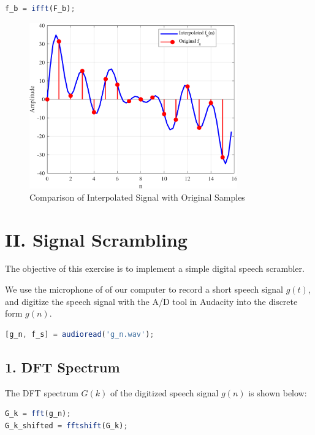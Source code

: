 \documentclass[12pt]{article}
\begin{document}
\begin{lstlisting}[language=Octave, caption=IFFT]
f_b = ifft(F_b);
\end{lstlisting}

\begin{figure}[H]
    \centering
    \includegraphics[width=0.8\textwidth]{f_b.png}
    \caption{Comparison of Interpolated Signal with Original Samples}
\end{figure}


\newpage
\section*{II. Signal Scrambling}
The objective of this exercise is to implement a simple digital speech scrambler.

We use the microphone of of our computer to record a short speech signal $g(t)$, and digitize the speech signal with the A/D tool in Audacity into the discrete form $g(n)$.

\begin{lstlisting}[language=Octave, caption=Reading in Audio File]
[g_n, f_s] = audioread('g_n.wav');
\end{lstlisting}


\subsection*{1. DFT Spectrum}
The DFT spectrum $G(k)$ of the digitized speech signal $g(n)$ is shown below:

\begin{lstlisting}[language=Octave, caption=FFT of Audio Sequence]
G_k = fft(g_n);
G_k_shifted = fftshift(G_k);
\end{lstlisting}
\end{document}
